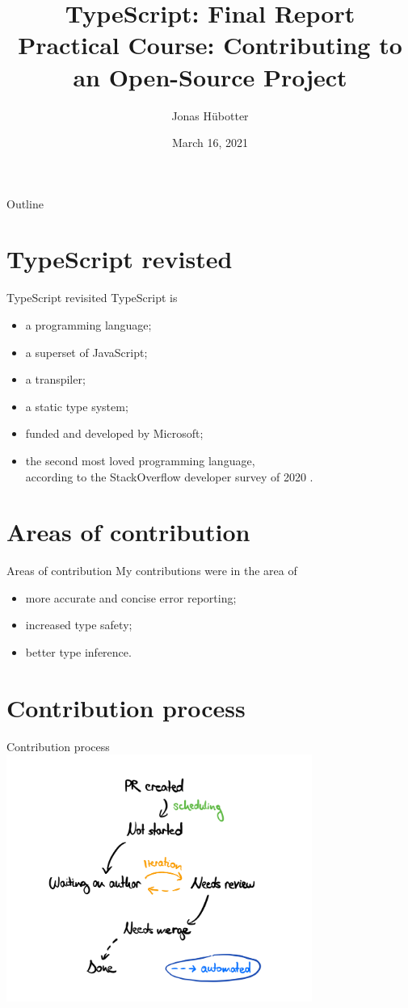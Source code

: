 \documentclass{beamer}
\title{TypeScript: Final Report \\[0.1cm] \small{Practical Course: Contributing to an Open-Source Project}}
\author{Jonas Hübotter}
\date{March 16, 2021}
\theoremstyle{definition}
\begin{document}
\begin{frame}
  \titlepage
\end{frame}

\begin{frame}{Outline}
 \tableofcontents
\end{frame}

\section{TypeScript revisted}
\begin{frame}{TypeScript revisited}
TypeScript is
\begin{itemize}
    \item a programming language\pause;
    \item a superset of JavaScript\pause;
    \item a transpiler\pause;
    \item a static type system\pause;
    \item funded and developed by Microsoft\pause;
    \item the second most loved programming language, \\ according to the StackOverflow developer survey of 2020 \cite{StackOverflow2020}.
\end{itemize}
\end{frame}

\section{Areas of contribution}
\begin{frame}{Areas of contribution}
My contributions were in the area of
\begin{itemize}
    \item more accurate and concise error reporting;
    \item increased type safety;
    \item better type inference.
\end{itemize}
\end{frame}

\section{Contribution process}
\begin{frame}{Contribution process}\pause
\centering
\includegraphics[width=10cm]{images/pr_backlog.png}
\end{frame}
\end{document}
